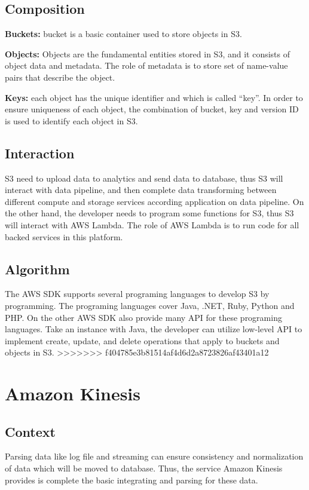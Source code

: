 	\subsection{Composition}
	\textbf{Buckets:} bucket is a basic container used to store objects in S3\cite{z1}.
     
    \noindent \textbf{Objects:} Objects are the fundamental entities stored in S3, and it consists of object data and metadata. The role of metadata is to store set of name-value pairs that describe the object\cite{z1}.
        
	\noindent \textbf{Keys:} each object has the unique identifier and which is called “key”. In order to ensure uniqueness of each object, the combination of bucket, key and version ID is used to identify each object in S3\cite{z1}.
    
	\subsection{Interaction}
    S3 need to upload data to analytics and send data to database, thus S3 will interact with data pipeline, and then complete data transforming between different compute and storage services according application on data pipeline. On the other hand, the developer needs to program some functions for S3, thus S3 will interact with AWS Lambda. The role of AWS Lambda is to run code for all backed services in this platform.
    
	\subsection{Algorithm}
    The AWS SDK supports several programing languages to develop S3 by programming. The programing languages cover Java, .NET, Ruby, Python and PHP. On the other AWS SDK also provide many API for these programing languages. Take an instance with Java, the developer can utilize low-level API to implement create, update, and delete operations that apply to buckets and objects in S3\cite{z2}. 
>>>>>>> f404785e3b81514af4d6d2a8723826af43401a12
   
\section{Amazon Kinesis}
	\subsection{Context}
    Parsing data like log file and streaming can ensure consistency and normalization of data which will be moved to database. Thus, the service Amazon Kinesis provides is complete the basic integrating and parsing for these data.
        
